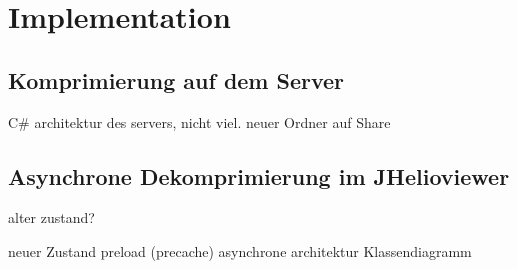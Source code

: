\section{Implementation}

\subsection{Komprimierung auf dem Server}
C\# architektur des servers, nicht viel.
neuer Ordner auf Share


\subsection{Asynchrone Dekomprimierung im JHelioviewer}
alter zustand?

neuer Zustand
preload
(precache)
asynchrone architektur
Klassendiagramm
